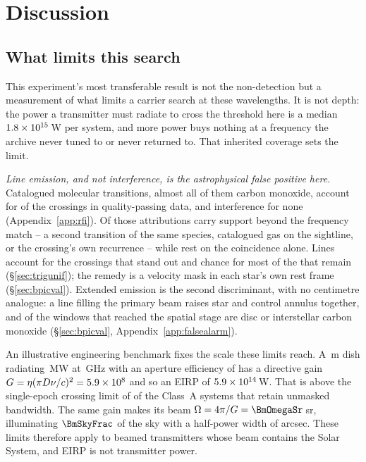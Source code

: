 \section{Discussion}
\label{sec:discussion}

\subsection{What limits this search}
\label{sec:mmdifferent}

This experiment's most transferable result is not the non-detection but a
measurement of what limits a carrier search at these wavelengths. It is not
depth: the power a transmitter must radiate to cross the threshold here is a
median $1.8\times10^{15}$\,W per system, and more power buys nothing at a
frequency the archive never tuned to or never returned to. That inherited
coverage sets the limit.

\emph{Line emission, and not interference, is the astrophysical false positive
here.} Catalogued molecular transitions, almost all of them carbon monoxide,
account for \EvNAttrQp{} of the \EvNCrossQp{} crossings in quality-passing
data, and interference for none (Appendix~\ref{app:rfi}). Of those
attributions \LnAttrSupp{} carry support beyond the frequency match -- a second
transition of the same species, catalogued gas on the sightline, or the
crossing's own recurrence -- while \LnAttrCoincWord{} rest on the coincidence
alone. Lines account for the crossings that stand out and chance for most of
the \EvNUnattrQp{} that remain (\S\ref{sec:trigunif}); the remedy is a
velocity mask in each star's own rest frame (\S\ref{sec:bpicval}). Extended
emission is the second discriminant, with no centimetre analogue: a line
filling the primary beam raises star and control annulus together, and
\DiscFpWin{} of the \DiscFpOfFlags{} windows that reached the spatial stage
are disc or interstellar carbon monoxide (\S\ref{sec:bpicval},
Appendix~\ref{app:falsealarm}).

An illustrative engineering benchmark fixes the scale these limits reach. A
\BenchDiam\,m dish radiating \BenchPowerMW\,MW at \BenchFreqGHz\,GHz with an
aperture efficiency of \BenchEta{} has a directive gain
$G=\eta(\pi D\nu/c)^{2}=5.9\times10^{8}$ and so an EIRP of $5.9\times10^{14}$\,W. That is
above the single-epoch crossing limit of \BenchNSysA{} of the \NSysALim{} Class~A
systems that retain unmasked bandwidth. The same gain makes its beam
$\Omega=4\pi/G=\BmOmegaSr$\,sr, illuminating $\BmSkyFrac$ of the sky with a
half-power width of \BmArcsec{} arcsec. These limits therefore apply to beamed
transmitters whose beam contains the Solar System, and EIRP is not transmitter
power.

